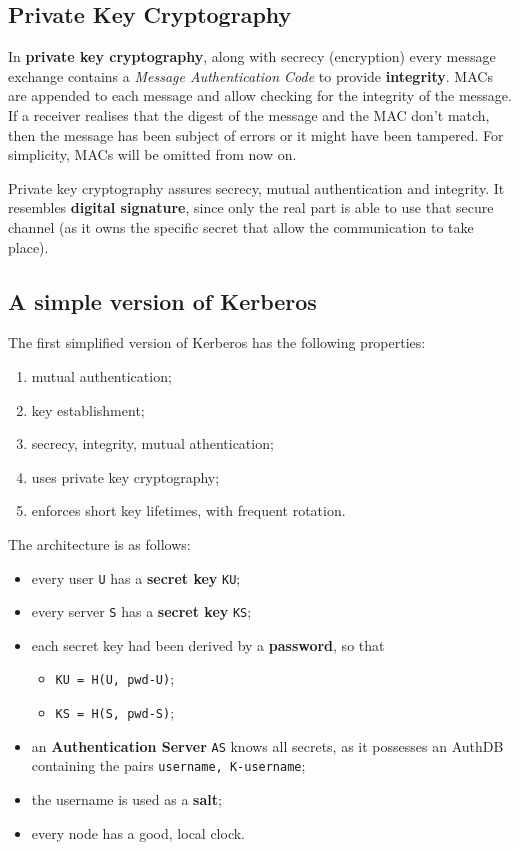 \documentclass[10pt]{extreport}
\begin{document}
\subsection{Private Key Cryptography}

In \textbf{private key cryptography}, along with secrecy (encryption) every
message exchange contains a \emph{Message Authentication Code} to provide
\textbf{integrity}. MACs are appended to each message and allow checking for
the integrity of the message. If a receiver realises that the digest of the
message and the MAC don't match, then the message has been subject of errors or it
might have been tampered. For simplicity, MACs will be omitted from now on.

Private key cryptography assures secrecy, mutual authentication and integrity.
It resembles \textbf{digital signature}, since only the real part is able to
use that secure channel (as it owns the specific secret that allow the
communication to take place).

\subsection{A simple version of Kerberos}

The first simplified version of Kerberos has the following properties:
\begin{enumerate}
    \item mutual authentication;
    \item key establishment;
    \item secrecy, integrity, mutual athentication;
    \item uses private key cryptography;
    \item enforces short key lifetimes, with frequent rotation.
\end{enumerate}

The architecture is as follows:
\begin{itemize}
    \item every user \texttt{U} has a \textbf{secret key} \texttt{KU};
    \item every server \texttt{S} has a \textbf{secret key} \texttt{KS};
    \item each secret key had been derived by a \textbf{password}, so that
    \begin{itemize}
        \item \texttt{KU = H(U, pwd-U)};
        \item \texttt{KS = H(S, pwd-S)};
    \end{itemize}
    \item an \textbf{Authentication Server} \texttt{AS} knows all secrets, as it
        possesses an AuthDB containing the pairs \texttt{username, K-username};
    \item the username is used as a \textbf{salt};
    \item every node has a good, local clock.
\end{itemize}
\end{document}
